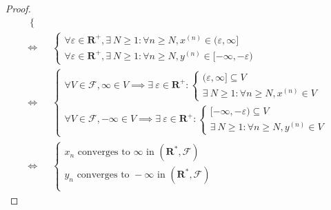 \begin{proof}
\begin{align*}
\begin{cases}
               \end{cases}                                                  \\
        \iff & \begin{cases}
                   \forall \varepsilon \in \mathbf{R}^+, \exists\ N \geq 1 : \forall n \geq N, x^{(n)} \in (\varepsilon, \infty] \\
                   \forall \varepsilon \in \mathbf{R}^+, \exists\ N \geq 1 : \forall n \geq N, y^{(n)} \in [-\infty, -\varepsilon)
               \end{cases} \\
        \iff & \begin{cases}
                   \forall V \in \mathcal{F}, \infty \in V \implies \exists\ \varepsilon \in \mathbf{R}^+ : \begin{cases}
                                                                                                         (\varepsilon, \infty] \subseteq V \\
                                                                                                         \exists\ N \geq 1 : \forall n \geq N, x^{(n)} \in V
                                                                                                     \end{cases} \\
                   \forall V \in \mathcal{F}, -\infty \in V \implies \exists\ \varepsilon \in \mathbf{R}^+ : \begin{cases}
                                                                                                          [-\infty, -\varepsilon) \subseteq V \\
                                                                                                          \exists\ N \geq 1 : \forall n \geq N, y^{(n)} \in V
                                                                                                      \end{cases}
               \end{cases}                                \\
        \iff & \begin{cases}
                   x_n \text{ converges to } \infty \text{ in } (\mathbf{R}^*, \mathcal{F})  \\
                   y_n \text{ converges to } -\infty \text{ in } (\mathbf{R}^*, \mathcal{F}) \\
               \end{cases}
    \end{align*}
\end{proof}

